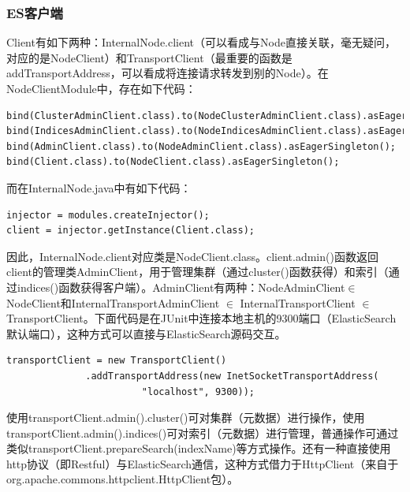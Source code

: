 \subsubsection{ES客户端}
Client有如下两种：InternalNode.client（可以看成与Node直接关联，毫无疑问，对应的是NodeClient）和TransportClient（最重要的函数是addTransportAddress，可以看成将连接请求转发到别的Node）。在NodeClientModule中，存在如下代码：
\begin{small}
\begin{verbatim}
bind(ClusterAdminClient.class).to(NodeClusterAdminClient.class).asEagerSingleton();
bind(IndicesAdminClient.class).to(NodeIndicesAdminClient.class).asEagerSingleton();
bind(AdminClient.class).to(NodeAdminClient.class).asEagerSingleton();
bind(Client.class).to(NodeClient.class).asEagerSingleton();
\end{verbatim}
\end{small}
而在InternalNode.java中有如下代码：
\begin{verbatim}
injector = modules.createInjector();
client = injector.getInstance(Client.class);
\end{verbatim}
\par 因此，InternalNode.client对应类是NodeClient.class。client.admin()函数返回client的管理类AdminClient，用于管理集群（通过cluster()函数获得）和索引（通过indices()函数获得客户端）。AdminClient有两种：NodeAdminClient$\in$NodeClient和InternalTransportAdminClient $\in$ InternalTransportClient $\in$ TransportClient。下面代码是在JUnit中连接本地主机的9300端口（ElasticSearch默认端口），这种方式可以直接与ElasticSearch源码交互。
\begin{verbatim}
transportClient = new TransportClient()
              .addTransportAddress(new InetSocketTransportAddress(
						"localhost", 9300));
\end{verbatim}
使用transportClient.admin().cluster()可对集群（元数据）进行操作，使用transportClient.admin().indices()可对索引（元数据）进行管理，普通操作可通过类似transportClient.prepareSearch(indexName)等方式操作。还有一种直接使用http协议（即Restful）与ElasticSearch通信，这种方式借力于HttpClient（来自于org.apache.commons.httpclient.HttpClient包）。
